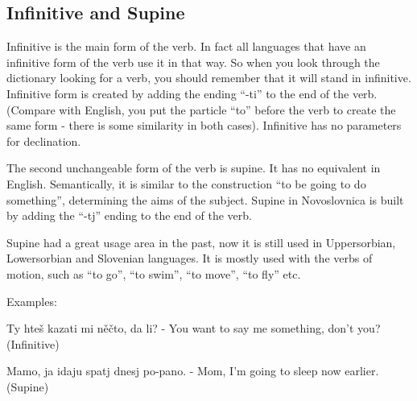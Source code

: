 \subsection{Infinitive and Supine}

Infinitive is the main form of the verb. In fact all languages that have an infinitive form of the verb use it in that way. So when you look through the dictionary looking for a verb, you should remember that it will stand in infinitive. Infinitive form is created by adding the ending “-ti” to the end of the verb. (Compare with English, you put the particle “to” before the verb to create the same form - there is some similarity in both cases). Infinitive has no parameters for declination.

The second unchangeable form of the verb is supine. It has no equivalent in English. Semantically, it is similar to the construction “to be going to do something”, determining the aims of the subject. Supine in Novoslovnica is built by adding the “-tj” ending to the end of the verb.

Supine had a great usage area in the past, now it is still used in Uppersorbian, Lowersorbian and Slovenian languages. It is mostly used with the verbs of motion, such as “to go”, “to swim”, “to move”, “to fly” etc.

Examples:

Ty hteš kazati mi něčto, da li? - You want to say me something, don’t you? (Infinitive)

Mamo, ja idaju spatj dnesj po-pano. - Mom, I’m going to sleep now earlier. (Supine)
